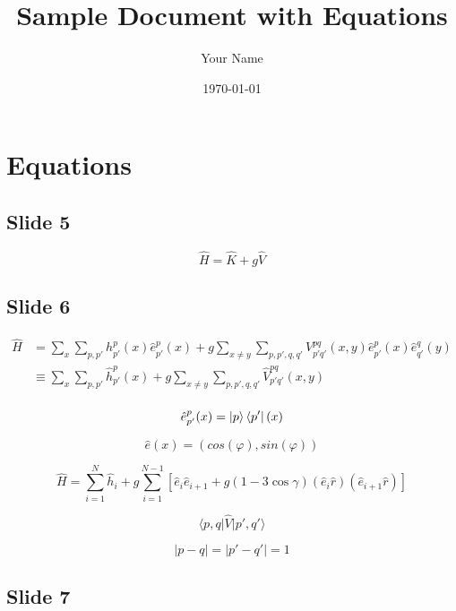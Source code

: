 \documentclass[a4paper,11pt]{article}
\title{Sample Document with Equations}
\author{Your Name}
\date{\today}
\begin{document}
\tableofcontents

\section{Equations}


\subsection*{Slide 5}

\begin{equation}
\hat{H} = \hat{K} + g\hat{V}
\end{equation}


\subsection*{Slide 6}

\begin{align}
  \hat{H} &= \sum_{x}\sum_{p, p'} h^{p}_{p'}(x) \hat{e}^{p}_{p'}(x) + g \sum_{x \ne y}\sum_{p, p', q, q'} V^{pq}_{p'q'}(x, y) \hat{e}^{p}_{p'}(x) \hat{e}^{q}_{q'}(y) \\
  &\equiv \sum_{x}\sum_{p, p'} \hat{h}^{p}_{p'}(x) + g \sum_{x \ne y}\sum_{p, p', q, q'} \hat{V}^{pq}_{p'q'}(x, y) \\
\end{align}

\begin{equation}
  \hat{e}^{p}_{p'}(x) = \ket{p}\bra{p'}(x)
\end{equation}

\begin{equation}
  \hat{e}(x) = (cos(\varphi), sin(\varphi))
\end{equation}

\begin{equation}
\hat{H} = \sum_{i=1}^{N} \hat{h}_{i} + g \sum_{i=1}^{N-1} [\hat{e}_{i}\hat{e}_{i+1} + g(1-3\cos\gamma)(\hat{e}_{i}\hat{r})(\hat{e}_{i+1}\hat{r})]
\end{equation}

\begin{equation}
  \langle p, q \vert \hat{V} \vert p', q' \rangle
\end{equation}

\begin{equation}
  \lvert p - q \rvert = \lvert p' - q' \rvert = 1
\end{equation}


\subsection*{Slide 7}
\end{document}
